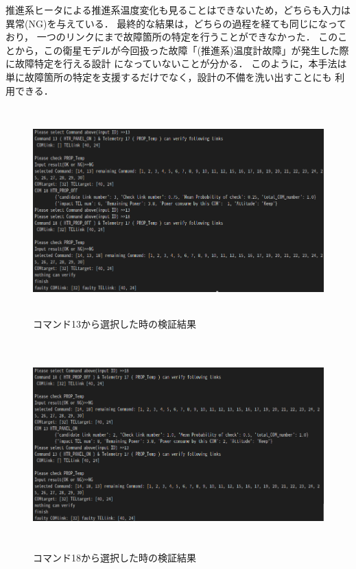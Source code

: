 \documentclass[11pt]{jsreport}
\begin{document}
推進系ヒータによる推進系温度変化も見ることはできないため，どちらも入力は異常(NG)を与えている．
最終的な結果は，どちらの過程を経ても同じになっており，
一つのリンクにまで故障箇所の特定を行うことができなかった．
このことから，この衛星モデルが今回扱った故障「(推進系)温度計故障」が発生した際に故障特定を行える設計
になっていないことが分かる．
このように，本手法は単に故障箇所の特定を支援するだけでなく，設計の不備を洗い出すことにも
利用できる．
\begin{figure}[H]
   \centering
      \includegraphics[height=8.0cm]{figure/COM14_TEL17_COM_COM_13start_mode2.png}
      \caption{コマンド13から選択した時の検証結果}
      \label{fig:COM13_start}
\end{figure}

\begin{figure}[H]
   \centering
      \includegraphics[height=8.0cm]{figure/COM14_TEL17_COM_COM_18start_mode2.png}
      \caption{コマンド18から選択した時の検証結果}
      \label{fig:COM18_start}
\end{figure}
\end{document}
